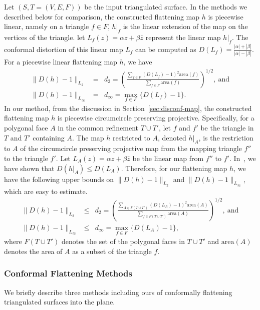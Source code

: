 \documentclass[11pt]{article}
\begin{document}
Let $(S, T=(V, E, F))$ be the input triangulated surface.
In the methods we described below for comparison, 
the constructed flattening map $h$ is piecewise linear, namely on a triangle $f \in F$, 
$h|_f$ is the linear extension of the map on the vertices of the triangle. 
let $L_f(z) = \alpha z + \beta \bar{z}$ represent the linear map $h|_f$. The conformal distortion 
of this linear map $L_f$ can be computed as  $D(L_f) = \frac{|\alpha| + |\beta|}{|\alpha| - |\beta|}$. 
For a piecewise linear flattening map $h$, we have
\begin{eqnarray}
\|D(h)-1\|_{L_2} &=& d_2 = \left(\frac{\sum_{f \in F}(D(L_f) - 1)^2 \text{area}(f)}{\sum_{f\in F} \text{area}(f)}\right)^{1/2},~\text{and}\\
\|D(h)-1\|_{L_\infty} &=& d_{\infty} = \max_{f\in F}\{D(L_f) - 1\}.
\end{eqnarray}
In our method, from the discussion in Section~\ref{sec:disconf-map}, the constructed flattening map $h$ 
is piecewise circumcircle preserving projective. Specifically, for a polygonal face $A$ in
the common refinement $T\cup T'$, let $f$ and $f'$ be the triangle in $T$ and $T'$ containing $A$. 
The map $h$ restricted to $A$, denoted $h|_A$, is the restriction to $A$ of the circumcircle preserving 
projective map from the mapping triangle $f''$ to the triangle $f'$.
Let $L_A(z) = \alpha z + \beta \bar{z}$ be the linear map from $f''$ to $f'$. In~\cite{glsw2}, we have shown
that $D(h|_A)\leq D(L_A)$. Therefore, for our flattening map $h$, we have the 
following upper bounds on $\|D(h)-1\|_{L_2}$ and $\|D(h)-1\|_{L_\infty}$, which are easy to estimate. 
\begin{eqnarray}
\|D(h)-1\|_{L_2} &\leq& d_2 = \left(\frac{\sum_{A \in F(T\cup T')}(D(L_A) - 1)^2 \text{area}(A)}{\sum_{f\in F(T\cup T')} \text{area}(A)}\right)^{1/2},~\text{and}\\
\|D(h)-1\|_{L_\infty} &\leq& d_{\infty} = \max_{f\in F}\{D(L_A) - 1\}, 
\end{eqnarray}
where $F(T\cup T')$ denotes the set of the polygonal faces in $T\cup T'$ and $\text{area}(A)$ denotes
the area of $A$ as a subset of the triangle $f$. 

\subsubsection{Conformal Flattening Methods}
We briefly describe three methods including ours of conformally flattening triangulated surfaces into the plane.
\end{document}
